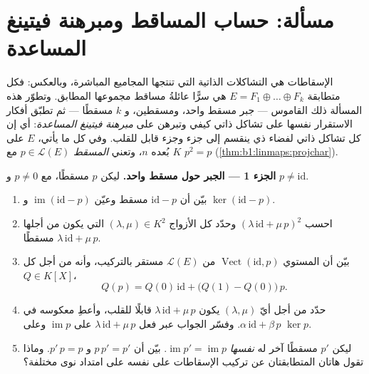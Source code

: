 \section{مسألة: حساب المساقط ومبرهنة فيتينغ المساعدة}

\begin{problem}\label{pb:b1:linmaps:1}
الإسقاطات هي التشاكلات الذاتية التي تنتجها المجاميع المباشرة،
وبالعكس: فكل متطابقة $E = F_1 \oplus \dots \oplus F_k$ هي
سرًّا عائلةُ مساقط مجموعها  المطابق. وتطوّر هذه
المسألة ذلك القاموس --- جبر مسقط واحد،
ومسقطين، و $k$ مسقطًا --- ثم تطبّق أفكار
الاستقرار نفسها على تشاكل ذاتي كيفي وتبرهن على
\emph{مبرهنة فيتينغ المساعدة}: أي إن كل تشاكل ذاتي لفضاء
ذي  ينقسم إلى جزء  وجزء
قابل للقلب. وفي كل ما يأتي، $E$  على $K$ بُعده
$n$، وتعني \emph{المسقط} $p \in \mathcal{L}(E)$
مع $p^2 = p$ (\cref{thm:b1:linmaps:projchar}).

\medskip
\noindent\textbf{الجزء 1 --- الجبر حول مسقط واحد.}
ليكن $p$ مسقطًا، مع $p \neq 0$ و $p \neq \mathrm{id}$.
\begin{enumerate}
  \item بيّن أن $\mathrm{id} - p$ مسقط وعيّن
        $\operatorname{im}(\mathrm{id} - p)$ و
        $\ker(\mathrm{id} - p)$.
  \item احسب $(\lambda\,\mathrm{id} + \mu\,p)^2$ وحدّد
        كل الأزواج $(\lambda, \mu) \in K^2$ التي يكون من أجلها
        $\lambda\,\mathrm{id} + \mu\,p$ مسقطًا.
  \item بيّن أن المستوي $\operatorname{Vect}(\mathrm{id}, p)$
        من $\mathcal{L}(E)$ مستقر بالتركيب، وأنه
        من أجل كل  $Q \in K[X]$،
        \[
        Q(p) = Q(0)\,\mathrm{id} + \bigl(Q(1) -
        Q(0)\bigr)\,p .
        \]
  \item حدّد من أجل أيّ $(\lambda, \mu)$ يكون 
        $\lambda\,\mathrm{id} + \mu\,p$ قابلًا للقلب، وأعطِ
        معكوسه في  $\alpha\,\mathrm{id} + \beta\,p$.
        وفسّر الجواب عبر فعل
        $\lambda\,\mathrm{id} + \mu\,p$ على $\operatorname{im} p$
        وعلى $\ker p$.
  \item ليكن $p'$ مسقطًا آخر له \emph{ نفسها}
        $\operatorname{im} p' = \operatorname{im} p$. بيّن أن
        $p\,p' = p'$ و $p'\,p = p$. وماذا تقول هاتان المتطابقتان
        عن تركيب الإسقاطات على  نفسه
        على امتداد نوى مختلفة؟
\end{enumerate}


\end{problem}
